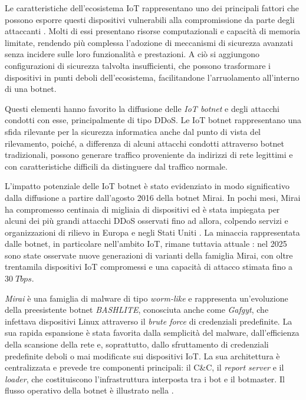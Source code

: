 Le caratteristiche dell'ecosistema IoT rappresentano uno dei principali fattori che possono esporre questi dispositivi vulnerabili alla compromissione da parte degli attaccanti \cite{lefoane2025iot}. Molti di essi presentano risorse computazionali e capacità di memoria limitate, rendendo più complessa l'adozione di meccanismi di sicurezza avanzati senza incidere sulle loro funzionalità e prestazioni. A ciò si aggiungono configurazioni di sicurezza talvolta insufficienti, che possono trasformare i dispositivi in punti deboli dell'ecosistema, facilitandone l'arruolamento all'interno di una botnet.


Questi elementi hanno favorito la diffusione delle \emph{IoT botnet} e degli attacchi condotti con esse, principalmente di tipo DDoS. Le IoT botnet rappresentano una sfida rilevante per la sicurezza informatica anche dal punto di vista del rilevamento, poiché, a differenza di alcuni attacchi condotti attraverso botnet tradizionali, possono generare traffico proveniente da indirizzi di rete legittimi e con caratteristiche difficili da distinguere dal traffico normale.

L'impatto potenziale delle IoT botnet è stato evidenziato in modo significativo dalla diffusione a partire dall'agosto 2016 della botnet Mirai. In pochi mesi, Mirai ha compromesso centinaia di migliaia di dispositivi ed è stata impiegata per alcuni dei più grandi attacchi DDoS osservati fino ad allora, colpendo servizi e organizzazioni di rilievo in Europa e negli Stati Uniti \cite{lefoane2025iot, antonakakis2017mirai}. La minaccia rappresentata dalle botnet, in particolare nell'ambito IoT, rimane tuttavia attuale \cite{nokia2025ddos}: nel 2025 sono state osservate nuove generazioni di varianti della famiglia Mirai, con oltre trentamila dispositivi IoT compromessi e una capacità di attacco stimata fino a $30 \; Tbps$. %

\emph{Mirai} \cite{antonakakis2017mirai} è una famiglia di malware di tipo \emph{worm-like} e rappresenta un'evoluzione della preesistente botnet \emph{BASHLITE}, conosciuta anche come \emph{Gafgyt}, che infettava dispositivi Linux attraverso il \emph{brute force} di credenziali predefinite. La sua rapida espansione è stata favorita dalla semplicità del malware, dall'efficienza della scansione della rete e, soprattutto, dallo sfruttamento di credenziali predefinite deboli o mai modificate sui dispositivi IoT. La sua architettura è centralizzata e prevede tre componenti principali: il C\&C, il \emph{report server} e il \emph{loader}, che costituiscono l'infrastruttura interposta tra i bot e il botmaster. Il flusso operativo della botnet è illustrato nella .

